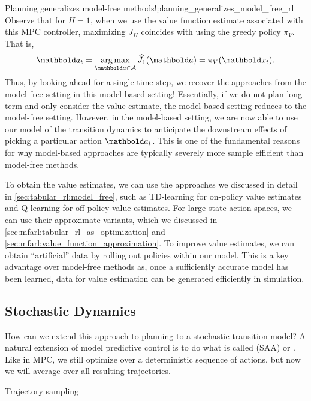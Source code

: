 \begin{rmk}{Planning generalizes model-free methods!}{planning_generalizes_model_free_rl}
  Observe that for $H=1$, when we use the value function estimate associated with this MPC controller, maximizing $J_H$ coincides with using the greedy policy $\pi_V$.
  That is, \begin{align}
    \va_t = \argmax_{\va \in \spA} \J{\va}[1] = \pi_{\fnV}(\vx_t).
  \end{align}
  Thus, by looking ahead for a single time step, we recover the approaches from the model-free setting in this model-based setting!
  Essentially, if we do not plan long-term and only consider the value estimate, the model-based setting reduces to the model-free setting.
  However, in the model-based setting, we are now able to use our model of the transition dynamics to anticipate the downstream effects of picking a particular action $\va_t$.
  This is one of the fundamental reasons for why model-based approaches are typically severely more sample efficient than model-free methods.
\end{rmk}

To obtain the value estimates, we can use the approaches we discussed in detail in \cref{sec:tabular_rl:model_free}, such as TD-learning for on-policy value estimates and Q-learning for off-policy value estimates.
For large state-action spaces, we can use their approximate variants, which we discussed in \cref{sec:mfarl:tabular_rl_as_optimization} and \cref{sec:mfarl:value_function_approximation}.
To improve value estimates, we can obtain ``artificial'' data by rolling out policies within our model.
This is a key advantage over model-free methods as, once a sufficiently accurate model has been learned, data for value estimation can be generated efficiently in simulation.

\subsection{Stochastic Dynamics}\label{sec:mbarl:planning:stochastic_dynamics}

How can we extend this approach to planning to a stochastic transition model?
A natural extension of model predictive control is to do what is called  (SAA) or  \citep{chua2018deep}.
Like in MPC, we still optimize over a deterministic sequence of actions, but now we will average over all resulting trajectories.

\begin{algorithm}
  \caption{Trajectory sampling}
\end{algorithm}

